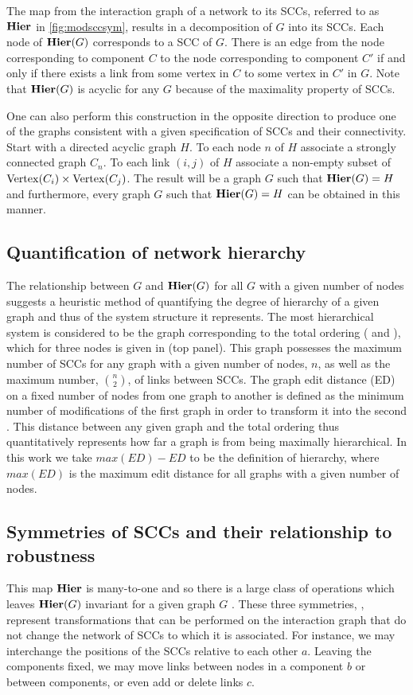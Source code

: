 The map from the interaction graph of a network to its SCCs, referred to as $\mathbf{Hier}$ in \ref{fig:modsccsym}, results in a decomposition of $G$ into its SCCs. Each node of $\mathbf{Hier} (G)$ corresponds to a SCC of $G$. There is an edge from the node corresponding to component $C$ to the node corresponding to component $C'$ if and only if there exists a link from some vertex in $C$ to some vertex in $C'$ in $G$. Note that $\mathbf{Hier} (G)$ is acyclic for any $G$ because of the maximality property of SCCs.

One can also perform this construction in the opposite direction to produce one of the graphs consistent with a given specification of SCCs and their connectivity.  Start with a directed acyclic graph $H$.  To each node $n$ of $H$ associate
a strongly connected graph $C_n$.  To each link $(i,j)$ of $H$ associate a non-empty subset of $\mathrm{Vertex}(C_i) \times \mathrm{Vertex}(C_j)$.  The result will be a graph $G$ such that $\mathbf{Hier}(G) = H$ and furthermore, every graph $G$ such that $\mathbf{Hier}(G) = H$ can be obtained in this manner.

\subsection{Quantification of network hierarchy}

The relationship between $G$ and $\mathbf{Hier}(G)$ for all $G$ with a given number of nodes suggests a heuristic method of quantifying the degree of hierarchy of a given graph and thus of the system structure it represents. The most hierarchical system is considered to be the graph corresponding to the total ordering ( and \cite{Cormen2009}), which for three nodes is given in  (top panel). This graph possesses the maximum number of SCCs for any graph with a given number of nodes, $n$, as well as the maximum number, $\binom{n}{2}$, of links between SCCs. The graph edit distance (ED) on a fixed number of nodes from one graph to another is defined as the minimum number of modifications of the first graph in order to transform it into the second \cite{Axenovich2011}. This distance between any given graph and the total ordering thus quantitatively represents how far a graph is from being maximally hierarchical. In this work we take $max(ED) - ED$ to be the definition of hierarchy, where $max(ED)$ is the maximum edit distance for all graphs with a given number of nodes.

\subsection{Symmetries of SCCs and their relationship to robustness}
This map $\mathbf{Hier}$ is many-to-one and so there is a large class of
operations which leaves $\mathbf{Hier}(G)$ invariant for a given graph $G$ . These three symmetries, , represent transformations that can be performed on the interaction graph that do not change the network of SCCs to which it is associated.
For instance, we may interchange the positions of the SCCs relative to each other $a$.  Leaving the components fixed, we may move links between nodes in a component $b$ or between components, or even add or delete links $c$.


